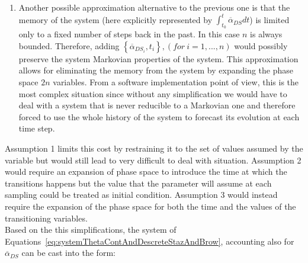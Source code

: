 \begin{enumerate}
  \item Another possible approximation alternative to the previous one is that the memory of the system (here
  explicitly represented by $ \int_{t_{0}}^{t}  \overline{\alpha }_{DS} dt$) is limited
  only to a fixed number of steps back in the past. In this case $n$ is always bounded. Therefore, adding  $\left \{
  \overline{\alpha}_{DS_{i}},t_{i} \right \}, \left ( for\: i=1,...,n \right )$ would possibly preserve the system
  Markovian properties of the system. This approximation allows for eliminating the memory from the system by
  expanding the phase space $2n$ variables. From a software implementation point of view, this is the most
  complex  situation since without any simplification we would have to deal with a system that is never reducible
  to a Markovian one and therefore forced to use the whole history of the system to forecast its evolution at each
  time step.
\end{enumerate}
Assumption 1 limits this cost by restraining it to the set of values assumed by the
variable but would still lead to very difficult to deal with situation. Assumption 2 would
require an expansion of phase space to introduce the time at which the transitions
happens but the value that the parameter will assume at each sampling could be
treated as initial condition. Assumption 3 would instead require the expansion of the
phase space for both the time and the values of the
transitioning variables.
\\Based on the this simplifications, the system of
Equations~\ref{eq:systemThetaContAndDescreteStazAndBrow}, accounting also for $ \overline{\alpha}_{DS}$ can be cast into the form:
